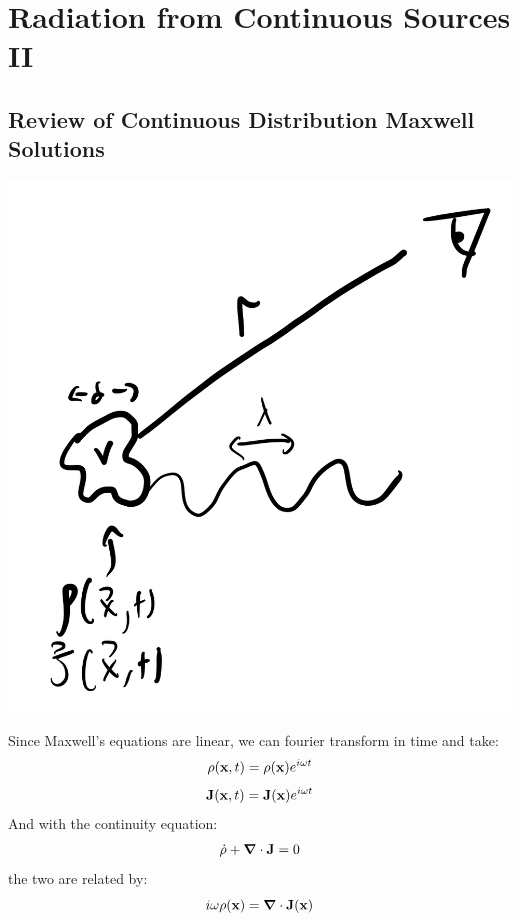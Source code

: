 \section{Radiation from Continuous Sources II}

\subsection{Review of Continuous Distribution Maxwell Solutions}

\begin{center}
    \includegraphics[scale=0.35]{Lectures/Images/lec11-continoussourceradiation.png}
\end{center}

Since Maxwell's equations are linear, we can fourier transform in time and take:
\begin{equation}
    \rho(\mathbf{x}, t) = \rho(\mathbf{x})e^{i\omega t}
\end{equation}\begin{equation}
    \mathbf{J}(\mathbf{x}, t) = \mathbf{J}(\mathbf{x})e^{i\omega t}
\end{equation}
And with the continuity equation:
\begin{equation}
    \dot{\rho} + \nabla \cdot \v{J} = 0
\end{equation}
the two are related by:
\begin{equation}
    i\omega \rho(\v{x}) = \nabla \cdot \v{J}(\v{x})
\end{equation}

